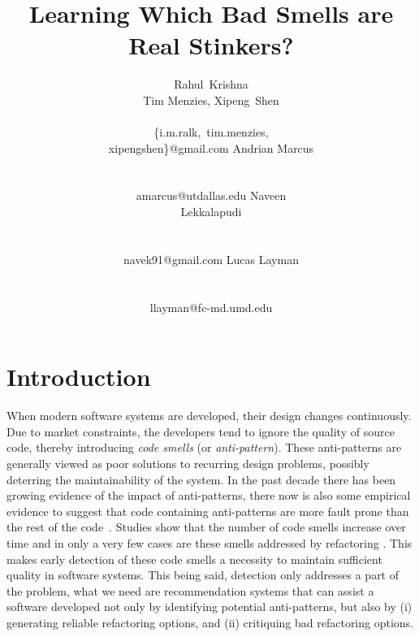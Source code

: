 \documentclass{sig-alternate}
\begin{document}
  


\title{Learning Which Bad Smells are 
Real Stinkers?}
\author{  
\alignauthor
Rahul~Krishna\\Tim Menzies, Xipeng~Shen \\
       \\
       {\{i.m.ralk,~tim.menzies,\\xipengshen\}@gmail.com}
\alignauthor
Andrian Marcus \\
        \\ 
       \\ 
       {amarcus@utdallas.edu}
       \alignauthor
Naveen  \\ Lekkalapudi\\
  \\ 
       \\ 
       {navek91@gmail.com}
\alignauthor
Lucas Layman \\
        \\ 
       \\ 
       {llayman@fc-md.umd.edu}
\setlength{\columnsep}{7mm}}
\maketitle
\begin{abstract}


\end{abstract}

\section{Introduction}

When modern software systems are developed, their design 
changes continuously. Due to market constraints, the developers tend to ignore the quality of source code, thereby introducing \textit{code smells} (or \textit{anti-pattern}). These anti-patterns are generally viewed as poor solutions to recurring design problems, possibly deterring the maintainability of the system. In the past decade there has been growing evidence of the impact of anti-patterns, there now is also some empirical evidence to suggest that code containing anti-patterns are more fault prone than the rest of the code~\cite{khomh12}\cite{li07}\cite{fab15_1}. Studies show that the number of code smells increase over time and in only a very few cases are these smells addressed by refactoring \cite{fab15_1}\cite{chatzigeorgiou10}\cite{arcoverde11}. This makes early detection of these code smells a necessity to maintain sufficient quality in software systems. This being said, detection only addresses a part of the problem, what we need are recommendation systems that can assist a software developed not only by identifying potential anti-patterns, but also by (i) generating reliable refactoring options, and (ii) critiquing bad refactoring options. 
\end{document}
